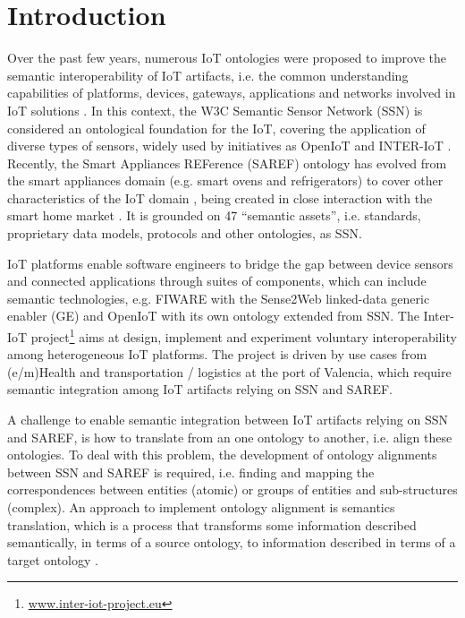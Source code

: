 \documentclass{sig-alternate-05-2015}
\begin{document}
\section{Introduction}

Over the past few years, numerous IoT ontologies were proposed to improve the semantic interoperability of IoT artifacts, i.e. the common understanding capabilities of platforms, devices, gateways, applications and networks involved in IoT solutions \cite{Ganzha2016a}. In this context, the W3C Semantic Sensor Network (SSN) is considered an ontological foundation for the IoT, covering the application of diverse types of sensors, widely used by initiatives as OpenIoT \cite{Soldatos2015} and INTER-IoT \cite{Ganzha2017a}. 
Recently, the Smart Appliances REFerence (SAREF) ontology has evolved from the smart appliances domain (e.g. smart ovens and refrigerators) \cite{Daniele2015} to cover other characteristics of the IoT domain \cite{Daniele2016b}, being created in close interaction with the smart home market \cite{Daniele2016}. It is grounded on 47 “semantic assets”, i.e. standards, proprietary data models, protocols and other ontologies, as SSN. 

IoT platforms enable software engineers to bridge the gap between device sensors and connected applications through suites of components, which can include semantic technologies, e.g. FIWARE with the Sense2Web linked-data generic enabler (GE) and OpenIoT with its own ontology extended from SSN. The Inter-IoT project\footnote{\url{www.inter-iot-project.eu}} aims at design, implement and experiment voluntary interoperability among heterogeneous IoT platforms. The project is driven by use cases from (e/m)Health and transportation / logistics at the port of Valencia, which require semantic integration among IoT artifacts relying on SSN and SAREF.  

A challenge to enable semantic integration between IoT artifacts relying on SSN and SAREF, is how to translate from an one ontology to another, i.e. align these ontologies. To deal with this problem, the development of ontology alignments between SSN and SAREF is required, i.e. finding and mapping the correspondences between entities (atomic) or groups of entities and sub-structures (complex). An approach to implement ontology alignment is semantics translation, which is a process that transforms some information described semantically, in terms of a source ontology, to information described in terms of a target ontology \cite{Ganzha2015}. 
\end{document}

